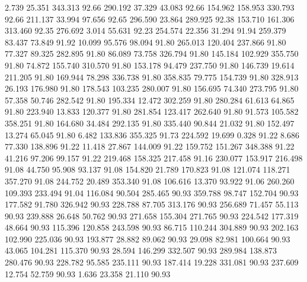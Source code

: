    2.739   25.351  343.313        92.66
 290.192   37.329   43.083        92.66
 154.962  158.953  330.793        92.66
 211.137   33.994   97.656        92.65
 296.590   23.864  289.925        92.38
 153.710  161.306  313.460        92.35
 276.692    3.014   55.631        92.23
 254.574   22.356   31.294        91.94
 259.379   83.437   73.849        91.92
  10.099   95.576   98.094        91.80
 265.013  120.404  237.866        91.80
  77.327   89.325  282.895        91.80
  86.089   73.758  326.794        91.80
 145.184  102.929  355.750        91.80
  74.872  155.740  310.570        91.80
 153.178   94.479  237.750        91.80
 146.739   19.614  211.205        91.80
 169.944   78.298  336.738        91.80
 358.835   79.775  154.739        91.80
 328.913   26.193  176.980        91.80
 178.543  103.235  280.007        91.80
 156.695   74.340  273.795        91.80
  57.358   50.746  282.542        91.80
 195.334   12.472  302.259        91.80
 280.284   61.613   64.865        91.80
 223.940   13.833  120.377        91.80
 281.854  123.417  262.640        91.80
  91.573  105.582  358.251        91.80
 164.680   34.484  292.135        91.80
 335.440   90.844   21.032        91.80
 152.497   13.274   65.045        91.80
   6.482  133.836  355.325        91.73
 224.592   19.699    0.328        91.22
   8.686   77.330  138.896        91.22
  11.418   27.867  144.009        91.22
 159.752  151.267  348.388        91.22
  41.216   97.206   99.157        91.22
 219.468  158.325  217.458        91.16
 230.077  153.917  216.498        91.08
  44.750   95.908   93.137        91.08
 154.820   21.789  170.823        91.08
 121.074  118.271  357.270        91.08
 244.752   20.489  353.340        91.08
 106.616   13.370   93.922        91.06
 260.260  109.393  233.494        91.04
 116.084   90.504  285.465        90.93
 359.788   98.747  152.704        90.93
 177.582   91.780  326.942        90.93
 228.788   87.705  313.176        90.93
 256.689   71.457   55.113        90.93
 239.888   26.648   50.762        90.93
 271.658  155.304  271.765        90.93
 224.542  177.319   48.664        90.93
 115.396  120.858  243.598        90.93
  86.715  110.244  304.889        90.93
 202.163  102.990  225.036        90.93
 193.877   28.882   89.062        90.93
  29.098   82.981  100.664        90.93
  43.065  104.281  115.370        90.93
  28.594  146.299  332.507        90.93
 289.984  138.873  280.476        90.93
 228.782   95.585  235.111        90.93
 187.414   19.228  331.081        90.93
 237.609   12.754   52.759        90.93
   1.636   23.358   21.110        90.93

